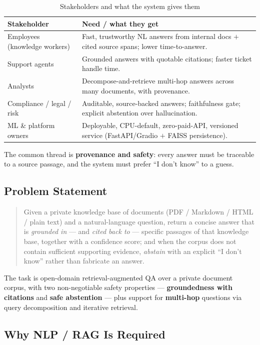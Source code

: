 \documentclass[12pt,a4paper]{article}
\begin{document}
\begin{table}[H]
\centering
\caption{Stakeholders and what the system gives them}
\small
\begin{tabularx}{\linewidth}{@{} l L @{}}
\toprule
\textbf{Stakeholder} & \textbf{Need / what they get} \\
\midrule
Employees (knowledge workers) & Fast, trustworthy NL answers from internal docs $+$ cited source spans; lower time-to-answer. \\
Support agents & Grounded answers with quotable citations; faster ticket handle time. \\
Analysts & Decompose-and-retrieve multi-hop answers across many documents, with provenance. \\
Compliance / legal / risk & Auditable, source-backed answers; faithfulness gate; explicit abstention over hallucination. \\
ML \& platform owners & Deployable, CPU-default, zero-paid-API, versioned service (FastAPI/Gradio $+$ FAISS persistence). \\
\bottomrule
\end{tabularx}
\end{table}

The common thread is \textbf{provenance and safety}: every answer must be traceable to a source passage, and the system must prefer ``I don't know'' to a guess.

\subsection{Problem Statement}

\begin{quote}
Given a private knowledge base of documents (PDF / Markdown / HTML / plain text) and a natural-language question, return a concise answer that is \textit{grounded in} --- and \textit{cited back to} --- specific passages of that knowledge base, together with a confidence score; and when the corpus does not contain sufficient supporting evidence, \textit{abstain} with an explicit ``I don't know'' rather than fabricate an answer.
\end{quote}

The task is open-domain retrieval-augmented QA over a private document corpus, with two non-negotiable safety properties --- \textbf{groundedness with citations} and \textbf{safe abstention} --- plus support for \textbf{multi-hop} questions via query decomposition and iterative retrieval.

\subsection{Why NLP / RAG Is Required}
\end{document}
